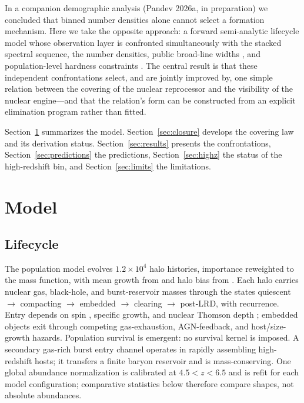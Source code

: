 \documentclass[twocolumn]{aastex631}
\begin{document}
In a companion demographic analysis (Pandev 2026a, in preparation) we
concluded that binned number densities alone cannot select a formation
mechanism. Here we take the opposite approach: a forward semi-analytic
lifecycle model whose observation layer is confronted simultaneously with
the stacked spectral sequence, the number densities, public broad-line
widths \citep{Hviding2025}, and population-level hardness constraints
\citep{Sok2026}. The central result is that these independent
confrontations select, and are jointly improved by, one simple relation
between the covering of the nuclear reprocessor and the visibility of the
nuclear engine---and that the relation's form can be constructed from an
explicit elimination program rather than fitted.

Section~\ref{sec:model} summarizes the model.
Section~\ref{sec:closure} develops the covering law and its derivation
status. Section~\ref{sec:results} presents the confrontations,
Section~\ref{sec:predictions} the predictions, Section~\ref{sec:highz} the
status of the high-redshift bin, and Section~\ref{sec:limits} the
limitations.

\section{Model}\label{sec:model}

\subsection{Lifecycle}
The population model evolves $1.2\times10^{4}$ halo histories, importance
reweighted to the \citet{Tinker2008} mass function, with mean growth from
\citet{Fakhouri2010} and halo bias from \citet{Tinker2010}. Each halo
carries nuclear gas, black-hole, and burst-reservoir masses through the
states quiescent $\rightarrow$ compacting $\rightarrow$ embedded
$\rightarrow$ clearing $\rightarrow$ post-LRD, with recurrence. Entry
depends on spin \citep{Bullock2001}, specific growth, and nuclear Thomson
depth \citep[low-angular-momentum compaction;][]{Mo1998}; embedded objects
exit through competing gas-exhaustion, AGN-feedback, and host/size-growth
hazards. Population survival is emergent: no survival kernel is imposed. A
secondary gas-rich burst entry channel operates in rapidly assembling
high-redshift hosts; it transfers a finite baryon reservoir and is
mass-conserving. One global abundance normalization is calibrated at
$4.5<z<6.5$ and is refit for each model configuration; comparative
statistics below therefore compare shapes, not absolute abundances.
\end{document}
